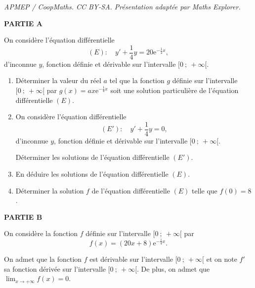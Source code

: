 \documentclass[10pt]{article}
\providecommand{\e}{{\mathrm{e}}}
\begin{document}
\noindent\textit{APMEP / CoopMaths. CC BY-SA. Présentation adaptée par Maths Explorer.}\par\medskip
\medskip

\textbf{PARTIE A}

\medskip

On considère l'équation différentielle 
\[(E) : \quad y' +\dfrac14y = 20\e^{-\frac14 x},\]
d'inconnue $y$, fonction définie et dérivable sur l'intervalle $[0~;~ +\infty[$.

\medskip

\begin{enumerate}
\item Déterminer la valeur du réel $a$ tel que la fonction $g$ définie sur l'intervalle $[0~;~ +\infty[$ par $g(x) = ax\e^{-\frac14 x}$ soit une solution particulière de l'équation différentielle $(E)$.

\item On considère l'équation différentielle 
\[(E') : \quad y' +\dfrac14 y = 0,\]
d'inconnue $y$, fonction définie et dérivable sur l'intervalle $[0~;~ +\infty[$.

Déterminer les solutions de l'équation différentielle $(E')$.
\item En déduire les solutions de l'équation différentielle $(E)$.
\item Déterminer la solution $f$ de l'équation différentielle $(E)$ telle que $f(0) = 8$.
\end{enumerate}

\medskip

\textbf{PARTIE B}

\medskip

On considère la fonction $f$ définie sur l'intervalle $[0~;~ +\infty[$ par 
\[f(x) = (20x + 8)\e^{-\frac14 x}.\]

On admet que la fonction $f$ est dérivable sur l'intervalle $[0~;~ +\infty[$ et on note $f'$ sa fonction dérivée sur l'intervalle $[0~;~ +\infty[$. De plus, on admet que $\displaystyle\lim_{x \to + \infty}f(x) = 0$.

\medskip
\end{document}
